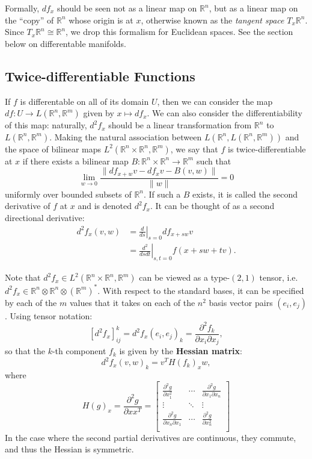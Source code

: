 \documentclass[reqno]{amsart}
\numberwithin{equation}{section}
\begin{document}
Formally, $df_x$ should be seen not as a linear map on $\mathbb R^n$, but
as a linear map on the ``copy'' of $\mathbb R^n$ whose origin is at $x$, otherwise known as
the \emph{tangent space} $T_x \mathbb R^n$. Since $T_x \mathbb R^n \cong \mathbb R^n$, we
drop this formalism for Euclidean spaces. See the section below on differentable manifolds.

\subsection{Twice-differentiable Functions}

If $f$ is differentable on all of its domain $U$, then we can consider the map
$df : U \to L(\mathbb R^n, \mathbb R^m)$ given by $x \mapsto df_x$. We can also consider the
differentiability of this map: naturally, $d^2f_x$ should be a linear transformation from
$\mathbb R^n$ to $L(\mathbb R^n, \mathbb R^m)$. Making the natural association between
$L(\mathbb R^n, L(\mathbb R^n, \mathbb R^m))$ and the space of bilinear maps
$L^2(\mathbb R^n \times \mathbb R^n, \mathbb R^m)$, we say that $f$ is twice-differentiable
at $x$ if there exists a bilinear map $B: \mathbb R^n \times \mathbb R^n \to \mathbb R^m$ such that
$$
    \lim_{w \to 0} \frac{\|df_{x+w} v - df_x v - B(v, w) \|}{\|w\|} = 0
$$
uniformly over bounded subsets of $\mathbb R^n$. If such a $B$ exists, it is called the
second derivative of $f$ at $x$ and is denoted $d^2 f_x$. It can be thought of as a
second directional derivative:
\begin{align*}
    d^2f_x(v, w) &= \left. \frac{d}{ds} \right|_{s=0} df_{x + sw}v \\
        &= \left. \frac{d^2}{dsdt} \right|_{s,t=0} f(x + sw + tv).
\end{align*}

Note that $d^2f_x \in L^2(\mathbb R^n \times \mathbb R^n, \mathbb R^m)$ can be viewed as
a type-$(2, 1)$ tensor, i.e. $d^2f_x \in \mathbb R^n \otimes \mathbb R^n \otimes (\mathbb R^m)^*$.
With respect to the standard bases, it can be specified by each of the
$m$ values that it takes on each of the $n^2$ basis vector pairs $(e_i, e_j)$. Using tensor
notation:
$$
    [d^2f_x]_{ij}^k = d^2f_x(e_i,e_j)_k = \frac{\partial^2 f_k}{\partial x_i \partial x_j},
$$
so that the $k$-th component $f_k$ is given by the \textbf{Hessian matrix}:
$$
    d^2f_x(v,w)_k = v^T  H(f_k)_x w,
$$
where
$$
    H(g)_x = \frac{\partial^2 g}{\partial x x^T} =
        \begin{bmatrix} \frac{\partial^2 g}{\partial x_1^2} & \cdots & \frac{\partial^2 g}{\partial x_1 \partial x_n} \\
        \vdots & \ddots & \vdots \\ 
        \frac{\partial^2 g}{\partial x_n \partial x_1} & \cdots & \frac{\partial^2 g}{\partial x_n^2} \\
        \end{bmatrix}
$$
In the case where the second partial derivatives are continuous, they commute, and thus
the Hessian is symmetric.
\end{document}

